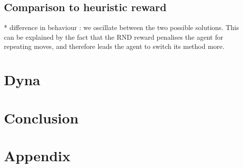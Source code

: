 \documentclass[a4paper, 12pt,oneside]{article}
\begin{document}
        \subsection{Comparison to heuristic reward}
        * difference in behaviour : we oscillate between the two possible solutions. This can be explained by the fact that the RND reward penalises the agent for repeating moves, and therefore leads the agent to switch its method more. 
        \section{Dyna}

        \section{Conclusion}

        \section{Appendix}
\end{document}
